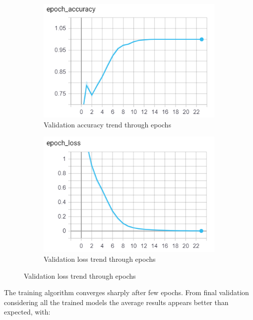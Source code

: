 \begin{center}
	\begin{figure}[H]
		\begin{subfigure}[H]{0.45\textwidth}
			\hfill\includegraphics[scale=0.8]{figures/last_model_val_acc.png}\vspace*{\fill}
			\caption{Validation accuracy trend through epochs}\label{fig:18a}
		\end{subfigure}
		\begin{subfigure}[H]{0.45\textwidth}
			\hfill\includegraphics[scale=0.8]{figures/last_model_val_loss.png}\vspace*{\fill}
			\caption{Validation loss trend through epochs}\label{fig:18b}
		\end{subfigure}
	\end{figure} 
\end{center}
The training algorithm converges sharply after few epochs. From final validation considering all the trained models the average results appears better than expected, with:\\


